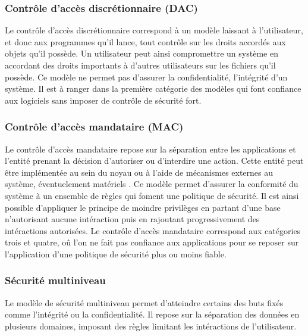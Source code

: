 \subsubsection{Contrôle d'accès discrétionnaire (DAC)}

Le contrôle d'accès discrétionnaire correspond à un modèle laissant à l'utilisateur, et donc aux programmes qu'il lance, tout contrôle sur les droits accordés aux objets qu'il possède. Un utilisateur peut ainsi compromettre un système en accordant des droits importants à d'autres utilisateurs sur les fichiers qu'il possède. Ce modèle ne permet pas d'assurer la confidentialité, l'intégrité d'un système. Il est à ranger dans la première catégorie des modèles qui font confiance aux logiciels sans imposer de contrôle de sécurité fort.

\subsubsection{Contrôle d'accès mandataire (MAC)}

Le contrôle d'accès mandataire repose sur la séparation entre les applications et l'entité prenant la décision d'autoriser ou d'interdire une action. Cette entité peut être implémentée au sein du noyau ou à l'aide de mécanismes externes au système, éventuelement matériels \cite{ITXT}. Ce modèle permet d'assurer la conformité du système à un ensemble de règles qui foment une politique de sécurité. Il est ainsi possible d'appliquer le principe de moindre privilèges en partant d'une base n'autorisant aucune intéraction puis en rajoutant progressivement des intéractions autorisées. Le contrôle d'accès mandataire correspond aux catégories trois et quatre, oû l'on ne fait pas confiance aux applications pour se reposer sur l'application d'une politique de sécurité plus ou moins fiable.


\subsubsection{Sécurité multiniveau}

Le modèle de sécurité multiniveau permet d'atteindre certains des buts fixés comme l'intégrité ou la confidentialité. Il repose sur la séparation des données en plusieurs domaines, imposant des règles limitant les intéractions de l'utilisateur.

